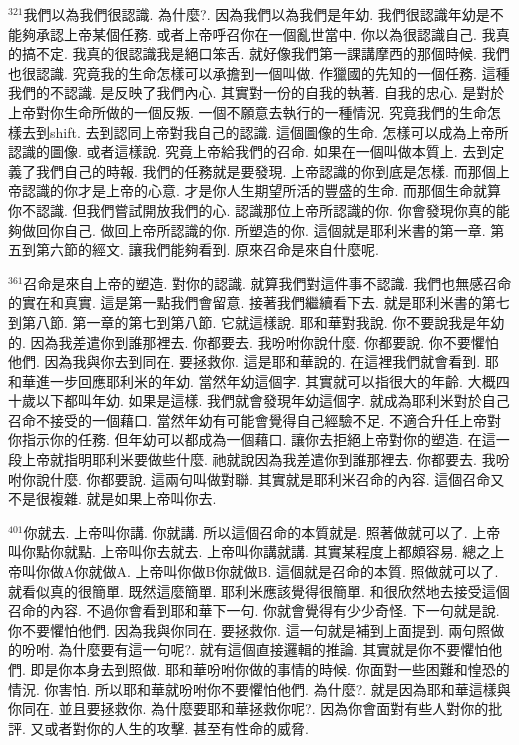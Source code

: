 \documentclass{book}
\begin{document}
$^{321}$我們以為我們很認識.
為什麼?.
因為我們以為我們是年幼.
我們很認識年幼是不能夠承認上帝某個任務.
或者上帝呼召你在一個亂世當中.
你以為很認識自己.
我真的搞不定.
我真的很認識我是絕口笨舌.
就好像我們第一課講摩西的那個時候.
我們也很認識.
究竟我的生命怎樣可以承擔到一個叫做.
作獵國的先知的一個任務.
這種我們的不認識.
是反映了我們內心.
其實對一份的自我的執著.
自我的忠心.
是對於上帝對你生命所做的一個反叛.
一個不願意去執行的一種情況.
究竟我們的生命怎樣去到shift.
去到認同上帝對我自己的認識.
這個圖像的生命.
怎樣可以成為上帝所認識的圖像.
或者這樣說.
究竟上帝給我們的召命.
如果在一個叫做本質上.
去到定義了我們自己的時報.
我們的任務就是要發現.
上帝認識的你到底是怎樣.
而那個上帝認識的你才是上帝的心意.
才是你人生期望所活的豐盛的生命.
而那個生命就算你不認識.
但我們嘗試開放我們的心.
認識那位上帝所認識的你.
你會發現你真的能夠做回你自己.
做回上帝所認識的你.
所塑造的你.
這個就是耶利米書的第一章.
第五到第六節的經文.
讓我們能夠看到.
原來召命是來自什麼呢.

$^{361}$召命是來自上帝的塑造.
對你的認識.
就算我們對這件事不認識.
我們也無感召命的實在和真實.
這是第一點我們會留意.
接著我們繼續看下去.
就是耶利米書的第七到第八節.
第一章的第七到第八節.
它就這樣說.
耶和華對我說.
你不要說我是年幼的.
因為我差遣你到誰那裡去.
你都要去.
我吩咐你說什麼.
你都要說.
你不要懼怕他們.
因為我與你去到同在.
要拯救你.
這是耶和華說的.
在這裡我們就會看到.
耶和華進一步回應耶利米的年幼.
當然年幼這個字.
其實就可以指很大的年齡.
大概四十歲以下都叫年幼.
如果是這樣.
我們就會發現年幼這個字.
就成為耶利米對於自己召命不接受的一個藉口.
當然年幼有可能會覺得自己經驗不足.
不適合升任上帝對你指示你的任務.
但年幼可以都成為一個藉口.
讓你去拒絕上帝對你的塑造.
在這一段上帝就指明耶利米要做些什麼.
祂就說因為我差遣你到誰那裡去.
你都要去.
我吩咐你說什麼.
你都要說.
這兩句叫做對聯.
其實就是耶利米召命的內容.
這個召命又不是很複雜.
就是如果上帝叫你去.

$^{401}$你就去.
上帝叫你講.
你就講.
所以這個召命的本質就是.
照著做就可以了.
上帝叫你點你就點.
上帝叫你去就去.
上帝叫你講就講.
其實某程度上都頗容易.
總之上帝叫你做A你就做A.
上帝叫你做B你就做B.
這個就是召命的本質.
照做就可以了.
就看似真的很簡單.
既然這麼簡單.
耶利米應該覺得很簡單.
和很欣然地去接受這個召命的內容.
不過你會看到耶和華下一句.
你就會覺得有少少奇怪.
下一句就是說.
你不要懼怕他們.
因為我與你同在.
要拯救你.
這一句就是補到上面提到.
兩句照做的吩咐.
為什麼要有這一句呢?.
就有這個直接邏輯的推論.
其實就是你不要懼怕他們.
即是你本身去到照做.
耶和華吩咐你做的事情的時候.
你面對一些困難和惶恐的情況.
你害怕.
所以耶和華就吩咐你不要懼怕他們.
為什麼?.
就是因為耶和華這樣與你同在.
並且要拯救你.
為什麼要耶和華拯救你呢?.
因為你會面對有些人對你的批評.
又或者對你的人生的攻擊.
甚至有性命的威脅.
\end{document}
